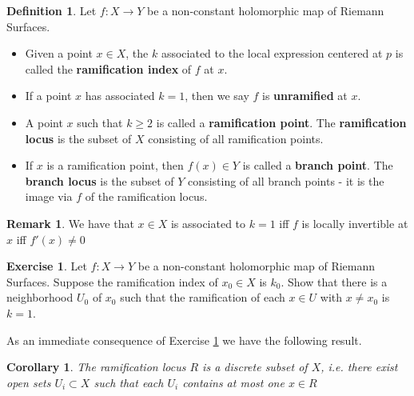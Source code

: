 \documentclass[12pt]{book}%
\theoremstyle{plain}
\newtheorem{corollary}[theorem]{Corollary}
\theoremstyle{definition}
\newtheorem{definition}[theorem]{Definition}
\newtheorem{exercise}{Exercise}
\newtheorem{remark}[theorem]{Remark}
\theoremstyle{remark}
\def\to{\rightarrow}
\begin{document}
\begin{definition}
Let $f:X \to Y$ be a non-constant holomorphic map of Riemann Surfaces.  
\begin{itemize}
\item Given a point $x \in X$, the $k$ associated to the local expression centered at $p$ is called the \textbf{ramification index} of $f$ at $x$.

\item If a point $x$ has associated $k=1$, then we say $f$ is \textbf{unramified} at $x$.

\item A point $x$ such that $k \geq 2$ is called a \textbf{ramification point}. The \textbf{ramification locus} is the subset of $X$ consisting of all ramification points.

\item If $x$ is a ramification point, then $f(x)\in Y$ is called a \textbf{branch point}. The \textbf{branch locus} is the subset of $Y$ consisting of all branch points - it is the image via $f$ of the ramification locus.
\end{itemize}
\end{definition}


\begin{figure}
\label{ramifiedCoverFigure}
\end{figure}

\begin{remark}
We have that $x \in X$ is associated to $k=1$ iff $f$ is locally invertible at $x$ iff $f'(x) \neq 0$
\end{remark}

\begin{exercise}
\label{discreteRamExercise}
Let $f:X \to Y$ be a non-constant holomorphic map of Riemann Surfaces. Suppose the ramification index of $x_0\in X$ is $k_0$. Show that there is a neighborhood $U_0$ of $x_0$ such that the ramification of each $x\in U$ with $x\neq x_0$ is $k=1$.
\end{exercise}

As an immediate consequence of Exercise \ref{discreteRamExercise} we have the following result.

\begin{corollary}
The ramification locus $R$ is a discrete subset of $X$, i.e. there exist open sets $U_i \subset X$ such that each $U_i$ contains at most one $x \in R$ 
\end{corollary}
\end{document}
